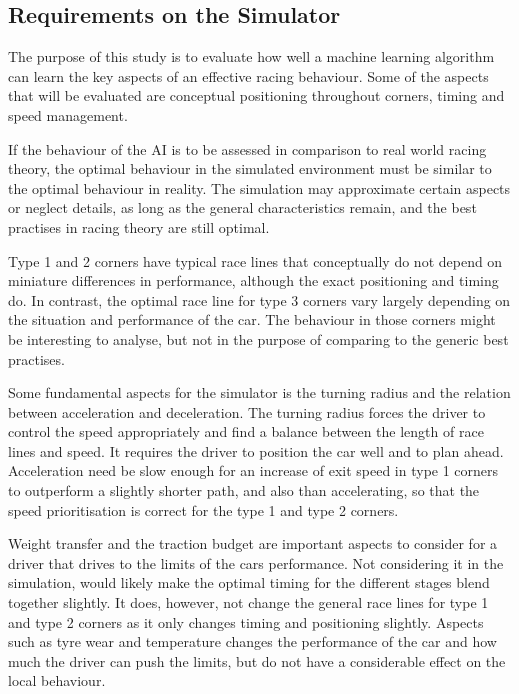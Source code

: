 \subsection{Requirements on the Simulator}
\label{requirements}
The purpose of this study is to evaluate how well a machine learning algorithm can learn the key aspects of an effective racing behaviour. Some of the aspects that will be evaluated are conceptual positioning throughout corners, timing and speed management.

If the behaviour of the AI is to be assessed in comparison to real world racing theory, the optimal behaviour in the simulated environment must be similar to the optimal behaviour in reality. The simulation may approximate certain aspects or neglect details, as long as the general characteristics remain, and the best practises in racing theory are still optimal. 

Type 1 and 2 corners have typical race lines that conceptually do not depend on miniature differences in performance, although the exact positioning and timing do. In contrast, the optimal race line for type 3 corners vary largely depending on the situation and performance of the car. The behaviour in those corners might be interesting to analyse, but not in the purpose of comparing to the generic best practises.

Some fundamental aspects for the simulator is the turning radius and the relation between acceleration and deceleration. The turning radius forces the driver to control the speed appropriately and find a balance between the length of race lines and speed. It requires the driver to position the car well and to plan ahead. Acceleration need be slow enough for an increase of exit speed in type 1 corners to outperform a slightly shorter path, and also than accelerating, so that the speed prioritisation is correct for the type 1 and type 2 corners. 

Weight transfer and the traction budget are important aspects to consider for a driver that drives to the limits of the cars performance. Not considering it in the simulation, would likely make the optimal timing for the different stages blend together slightly. It does, however, not change the general race lines for type 1 and type 2 corners as it only changes timing and positioning slightly. Aspects such as tyre wear and temperature changes the performance of the car and how much the driver can push the limits, but do not have a considerable effect on the local behaviour. 

